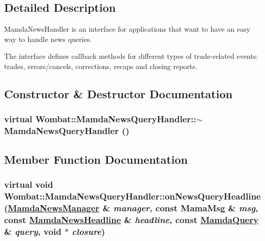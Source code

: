 \subsection{Detailed Description}
Mamda\-News\-Handler is an interface for applications that want to have an easy way to handle news queries. 

The interface defines callback methods for different types of trade-related events: trades, errors/cancels, corrections, recaps and closing reports. 



\subsection{Constructor \& Destructor Documentation}
\hypertarget{classWombat_1_1MamdaNewsQueryHandler_8ef2b61870d827f05705231859a901c9}{
\subsubsection[$\sim$MamdaNewsQueryHandler]{\setlength{\rightskip}{0pt plus 5cm}virtual Wombat::Mamda\-News\-Query\-Handler::$\sim$Mamda\-News\-Query\-Handler ()}}
\label{classWombat_1_1MamdaNewsQueryHandler_8ef2b61870d827f05705231859a901c9}




\subsection{Member Function Documentation}
\hypertarget{classWombat_1_1MamdaNewsQueryHandler_3ce9f8db36f347d0fedd9a85ef3d6d5d}{
\subsubsection[onNewsQueryHeadline]{\setlength{\rightskip}{0pt plus 5cm}virtual void Wombat::Mamda\-News\-Query\-Handler::on\-News\-Query\-Headline (\hyperlink{classWombat_1_1MamdaNewsManager}{Mamda\-News\-Manager} \& {\em manager}, const Mama\-Msg \& {\em msg}, const \hyperlink{classWombat_1_1MamdaNewsHeadline}{Mamda\-News\-Headline} \& {\em headline}, const \hyperlink{classWombat_1_1MamdaQuery}{Mamda\-Query} \& {\em query}, void $\ast$ {\em closure})}}
\label{classWombat_1_1MamdaNewsQueryHandler_3ce9f8db36f347d0fedd9a85ef3d6d5d}


